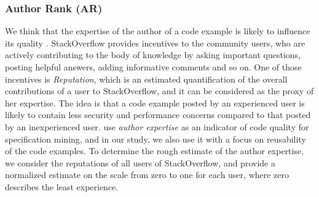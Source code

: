 \documentclass{sig-alternate}
\begin{document}
\subsubsection{Author Rank (AR)}
We think that the expertise of the author of a code example is likely to influence its quality \cite{specmining}. StackOverflow provides incentives to the community users, who are actively contributing to the body of knowledge by asking important questions, posting helpful answers, adding informative comments and so on. One of those incentives is \emph{Reputation}, which is an estimated quantification of the overall contributions of a user to StackOverflow, and it can be considered as the proxy of her expertise. The idea is that a code example posted by an experienced user is likely to contain less security and performance concerns compared to that posted by an inexperienced user. \citet{specmining} use \emph{author expertise} as an indicator of code quality for specification mining, and in our study, we also use it with a focus on reusability of the code examples. To determine the rough estimate of the author expertise, we consider the reputations of all users of StackOverflow, and provide a normalized estimate on the scale from zero to one for each user, where zero describes the least experience.
\end{document}
